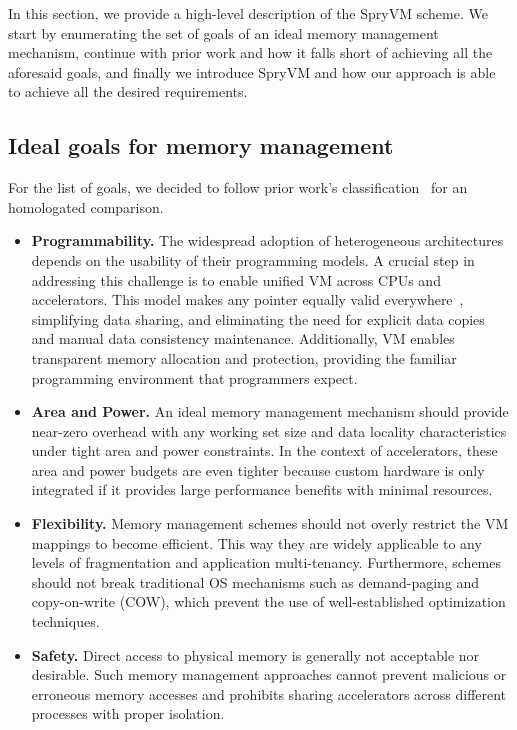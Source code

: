 
In this section, we provide a high-level description of the SpryVM scheme. We start by enumerating the set of goals of an ideal memory management mechanism, continue with prior work and how it falls short of achieving all the aforesaid goals, and finally we introduce SpryVM and how our approach is able to achieve all the desired requirements.

\subsection{Ideal goals for memory management}

For the list of goals, we decided to follow prior work's classification~\cite{haria:devirtualizing} for an homologated comparison.

\begin{itemize}
	\item \textbf{Programmability.} The widespread adoption of heterogeneous architectures depends on the usability of their programming models. A crucial step in addressing this challenge is to enable unified VM across CPUs and accelerators. This model makes any pointer equally valid everywhere~\cite{hsa}, simplifying data sharing, and eliminating the need for explicit data copies and manual data consistency maintenance. Additionally, VM enables transparent memory allocation and protection, providing the familiar programming environment that programmers expect.
	\item \textbf{Area and Power.} An ideal memory management mechanism should provide near-zero overhead with any working set size and data locality characteristics under tight area and power constraints. In the context of accelerators, these area and power budgets are even tighter because custom hardware is only integrated if it provides large performance benefits with minimal resources. 
	\item \textbf{Flexibility.} Memory management schemes should not overly restrict the VM mappings to become efficient. This way they are widely applicable to any levels of fragmentation and application multi-tenancy. Furthermore, schemes should not break traditional OS mechanisms such as demand-paging and copy-on-write (COW), which prevent the use of well-established optimization techniques.  
		
	\item \textbf{Safety.} Direct access to physical memory is generally not acceptable nor desirable. Such memory management approaches cannot prevent malicious or erroneous memory accesses and prohibits sharing accelerators across different processes with proper isolation.
\end{itemize}

